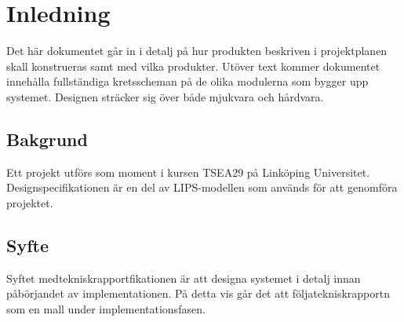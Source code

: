 \documentclass[tekniskrapport/tech.tex]{subfiles}
\begin{document}
\section{Inledning}
Det här dokumentet går in i detalj på hur produkten beskriven i projektplanen
skall konstrueras samt med vilka produkter. Utöver text kommer dokumentet
innehålla fullständiga kretsscheman på de olika modulerna som bygger upp
systemet. Designen sträcker sig över både mjukvara och hårdvara.

\subsection{Bakgrund}
Ett projekt utförs som moment i kursen TSEA29 på Linköping Universitet.
Designspecifikationen är en del av LIPS-modellen som används för att genomföra
projektet.\cite{svensson-lips}

\subsection{Syfte}
Syftet medtekniskrapportfikationen är att designa systemet i detalj innan
påbörjandet av implementationen. På detta vis går det att följatekniskrapportn
som en mall under implementationsfasen.
\end{document}
